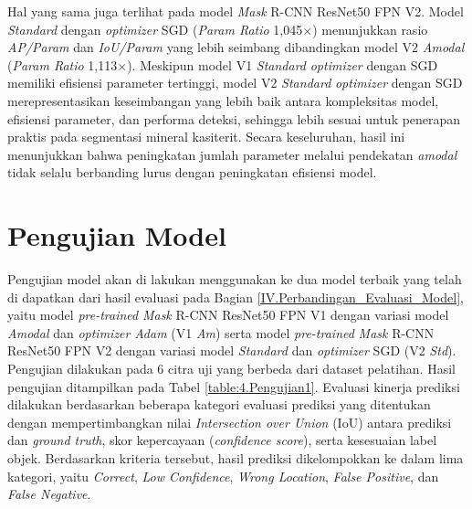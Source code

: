 Hal yang sama juga terlihat pada model \textit{Mask} R-CNN ResNet50 FPN V2. Model \textit{Standard} dengan \textit{optimizer} SGD (\textit{Param Ratio} 1{,}045$\times$) menunjukkan rasio \textit{AP/Param} dan \textit{IoU/Param} yang lebih seimbang dibandingkan model V2 \textit{Amodal} (\textit{Param Ratio} 1{,}113$\times$). Meskipun model V1 \textit{Standard} \textit{optimizer} dengan SGD memiliki efisiensi parameter tertinggi, model V2 \textit{Standard} \textit{optimizer} dengan SGD merepresentasikan keseimbangan yang lebih baik antara kompleksitas model, efisiensi parameter, dan performa deteksi, sehingga lebih sesuai untuk penerapan praktis pada segmentasi mineral kasiterit. Secara keseluruhan, hasil ini menunjukkan bahwa peningkatan jumlah parameter melalui pendekatan \textit{amodal} tidak selalu berbanding lurus dengan peningkatan efisiensi model. \par


\section{Pengujian Model} \label{IV.Pengujian_Model}
Pengujian model akan di lakukan menggunakan ke dua model terbaik yang telah di dapatkan dari hasil evaluasi pada Bagian \ref{IV.Perbandingan_Evaluasi_Model}, yaitu model \textit{pre-trained} \textit{Mask} R-CNN ResNet50 FPN V1 dengan variasi model \textit{Amodal} dan \textit{optimizer} \textit{Adam} (V1 \textit{Am}) serta model \textit{pre-trained} \textit{Mask} R-CNN ResNet50 FPN V2 dengan variasi model \textit{Standard} dan \textit{optimizer} SGD (V2 \textit{Std}). Pengujian dilakukan pada 6 citra uji yang berbeda dari dataset pelatihan. Hasil pengujian ditampilkan pada Tabel \ref{table:4.Pengujian1}. Evaluasi kinerja prediksi dilakukan berdasarkan beberapa kategori evaluasi prediksi yang ditentukan dengan mempertimbangkan nilai \textit{Intersection over Union} (IoU) antara prediksi dan \textit{ground truth}, skor kepercayaan (\textit{confidence score}), serta kesesuaian label objek. Berdasarkan kriteria tersebut, hasil prediksi dikelompokkan ke dalam lima kategori, yaitu \textit{Correct}, \textit{Low Confidence}, \textit{Wrong Location}, \textit{False Positive}, dan \textit{False Negative}. 

